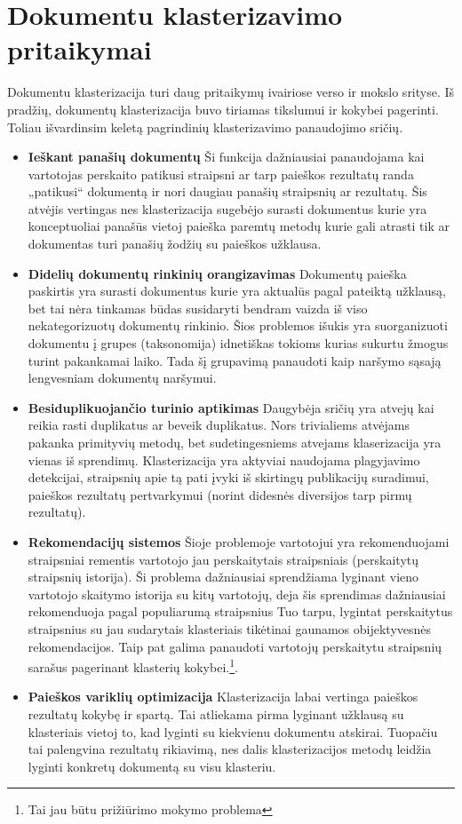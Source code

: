 \documentclass{VUMIFInfKursinis}
\begin{document}
\section{Dokumentu klasterizavimo pritaikymai}
	Dokumentu klasterizacija turi daug pritaikymų ivairiose verso ir mokslo srityse. Iš pradžių, dokumentų klasterizacija buvo tiriamas  tikslumui ir kokybei pagerinti. Toliau išvardinsim keletą pagrindinių klasterizavimo panaudojimo sričių\cite{jajoo2008document}.
	\begin{itemize}
		\item \textbf{Ieškant panašių dokumentų} Ši funkcija dažniausiai panaudojama kai vartotojas perskaito patikusi straipsni ar tarp paieškos rezultatų randa „patikusi“ dokumentą ir nori daugiau panašių straipsnių ar rezultatų. Šis atvėjis vertingas nes klasterizacija sugebėjo surasti dokumentus kurie yra konceptuoliai panašūs vietoj paieška paremtų metodų kurie gali atrasti tik ar dokumentas turi panašių žodžių su paieškos užklausa.  
		\item \textbf{Didelių dokumentų rinkinių orangizavimas} Dokumentų paieška paskirtis yra surasti dokumentus kurie yra aktualūs pagal pateiktą užklausą, bet tai nėra tinkamas būdas susidaryti bendram vaizda iš viso nekategorizuotų dokumentų rinkinio. Šios problemos išukis yra suorganizuoti dokumentu į grupes (taksonomija) idnetiškas tokioms kurias sukurtu žmogus turint pakankamai laiko. Tada šį grupavimą panaudoti kaip naršymo sąsają lengvesniam dokumentų naršymui. 
		\item \textbf{Besiduplikuojančio turinio aptikimas} Daugybėja sričių yra atvejų kai reikia rasti duplikatus ar beveik duplikatus. Nors trivialiems atvėjams pakanka primityvių metodų, bet sudetingesniems atvejams klaserizacija yra vienas iš sprendimų. Klasterizacija yra aktyviai naudojama plagyjavimo detekcijai, straipsnių apie tą pati įvyki iš skirtingų publikacijų suradimui, paieškos rezultatų pertvarkymui (norint didesnės diversijos tarp pirmų rezultatų).
		\item \textbf{Rekomendacijų sistemos} Šioje problemoje vartotojui yra rekomenduojami straipsniai rementis vartotojo jau perskaitytais straipsniais (perskaitytų straipsnių istorija). Ši problema dažniausiai sprendžiama lyginant vieno vartotojo skaitymo istorija su kitų vartotojų, deja šis sprendimas dažniausiai rekomenduoja pagal populiarumą straipsnius  Tuo tarpu, lygintat perskaitytus straipsnius su jau sudarytais klasteriais tikėtinai gaunamos obijektyvesnės rekomendacijos. Taip pat galima panaudoti vartotojų perskaitytu straipsnių sarašus pagerinant klasterių kokybei.\footnote{Tai jau būtu prižiūrimo mokymo problema}.
		\item \textbf{Paieškos variklių optimizacija} Klasterizacija labai vertinga paieškos rezultatų kokybę ir spartą. Tai atliekama pirma lyginant užklausą su klasteriais vietoj to, kad lyginti su kiekvienu dokumentu atskirai. Tuopačiu tai palengvina rezultatų rikiavimą, nes dalis klasterizacijos metodų leidžia lyginti konkretų dokumentą su visu klasteriu.  
	\end{itemize}
\end{document}
